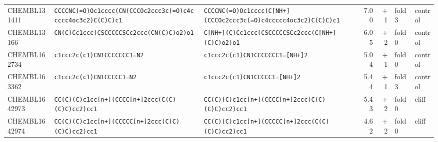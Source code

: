 \begin{longtable}{l p{4.4cm} p{4.4cm} r r l l}
CHEMBL131411 & \texttt{CCCCNC(\allowbreak{}=\allowbreak{}O)\allowbreak{}Oc1cccc(\allowbreak{}CN(\allowbreak{}CCCOc2ccc3c(\allowbreak{}=\allowbreak{}O)\allowbreak{}c4ccccc4oc3c2)\allowbreak{}C(\allowbreak{}C)\allowbreak{}C)\allowbreak{}c1} & \texttt{CCCCNC(\allowbreak{}=\allowbreak{}O)\allowbreak{}Oc1cccc(\allowbreak{}C[NH+]\allowbreak{}(\allowbreak{}CCCOc2ccc3c(\allowbreak{}=\allowbreak{}O)\allowbreak{}c4ccccc4oc3c2)\allowbreak{}C(\allowbreak{}C)\allowbreak{}C)\allowbreak{}c1} & 7.00 & +1 & fold 3 & control \\
CHEMBL13166 & \texttt{CN(\allowbreak{}C)\allowbreak{}Cc1ccc(\allowbreak{}CSCCCCCSCc2ccc(\allowbreak{}CN(\allowbreak{}C)\allowbreak{}C)\allowbreak{}o2)\allowbreak{}o1} & \texttt{C[NH+]\allowbreak{}(\allowbreak{}C)\allowbreak{}Cc1ccc(\allowbreak{}CSCCCCCSCc2ccc(\allowbreak{}C[NH+]\allowbreak{}(\allowbreak{}C)\allowbreak{}C)\allowbreak{}o2)\allowbreak{}o1} & 6.05 & +2 & fold 0 & control \\
CHEMBL162734 & \texttt{c1ccc2c(\allowbreak{}c1)\allowbreak{}CN1CCCCCCC1=\allowbreak{}N2} & \texttt{c1ccc2c(\allowbreak{}c1)\allowbreak{}CN1CCCCCCC1=\allowbreak{}[NH+]\allowbreak{}2} & 5.04 & +1 & fold 0 & control \\
CHEMBL163362 & \texttt{c1ccc2c(\allowbreak{}c1)\allowbreak{}CN1CCCCC1=\allowbreak{}N2} & \texttt{c1ccc2c(\allowbreak{}c1)\allowbreak{}CN1CCCCC1=\allowbreak{}[NH+]\allowbreak{}2} & 5.44 & +1 & fold 3 & control \\
CHEMBL1642973 & \texttt{CC(\allowbreak{}C)\allowbreak{}(\allowbreak{}C)\allowbreak{}c1cc[n+]\allowbreak{}(\allowbreak{}CCCC[n+]\allowbreak{}2ccc(\allowbreak{}C(\allowbreak{}C)\allowbreak{}(\allowbreak{}C)\allowbreak{}C)\allowbreak{}cc2)\allowbreak{}cc1} & \texttt{CC(\allowbreak{}C)\allowbreak{}(\allowbreak{}C)\allowbreak{}c1cc[n+]\allowbreak{}(\allowbreak{}CCCC[n+]\allowbreak{}2ccc(\allowbreak{}C(\allowbreak{}C)\allowbreak{}(\allowbreak{}C)\allowbreak{}C)\allowbreak{}cc2)\allowbreak{}cc1} & 5.43 & +2 & fold 0 & cliff \\
CHEMBL1642974 & \texttt{CC(\allowbreak{}C)\allowbreak{}(\allowbreak{}C)\allowbreak{}c1cc[n+]\allowbreak{}(\allowbreak{}CCCCC[n+]\allowbreak{}2ccc(\allowbreak{}C(\allowbreak{}C)\allowbreak{}(\allowbreak{}C)\allowbreak{}C)\allowbreak{}cc2)\allowbreak{}cc1} & \texttt{CC(\allowbreak{}C)\allowbreak{}(\allowbreak{}C)\allowbreak{}c1cc[n+]\allowbreak{}(\allowbreak{}CCCCC[n+]\allowbreak{}2ccc(\allowbreak{}C(\allowbreak{}C)\allowbreak{}(\allowbreak{}C)\allowbreak{}C)\allowbreak{}cc2)\allowbreak{}cc1} & 4.62 & +2 & fold 0 & cliff \\

\end{longtable}
